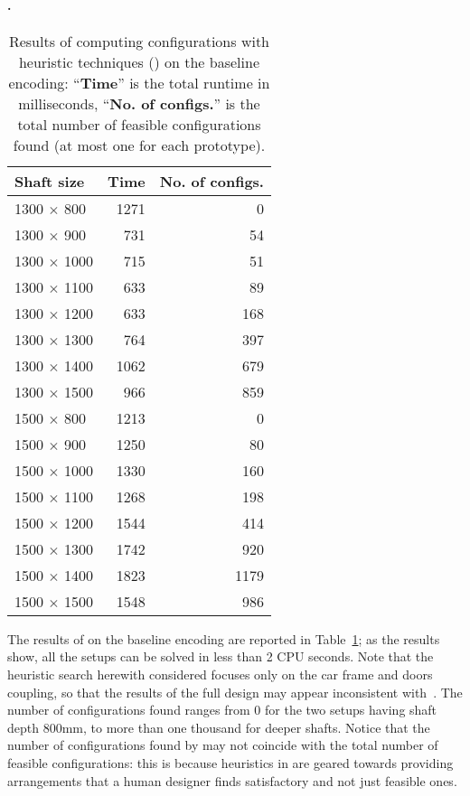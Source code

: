 \paragraph{\liftcreatehr.}
%
\begin{table}[t]
	\caption{\label{table:heuristicResult} Results of computing configurations with 
		heuristic techniques (\liftcreatehr{}) on the baseline encoding: 
		``\textbf{Time}'' is the total runtime in milliseconds, 
		``\textbf{No. of configs.}'' is the total number of feasible configurations 
		found (at most one for each prototype).}
	\setlength{\tabcolsep}{22pt}
	\centering
	\begin{tabular}{l rr}
		\toprule
		{\bf Shaft size} & {\bf Time} & {\bf No. of configs.}\\
		\midrule
		1300 $\times$ 800 & 1271 & 0 \\
		1300 $\times$ 900 & 731 & 54 \\
		1300 $\times$ 1000 & 715 & 51 \\
		1300 $\times$ 1100 & 633 & 89 \\
		1300 $\times$ 1200 & 633 & 168 \\
		1300 $\times$ 1300 & 764 & 397 \\
		1300 $\times$ 1400 & 1062 & 679 \\
		1300 $\times$ 1500 & 966 & 859 \\
		1500 $\times$ 800 & 1213 & 0 \\
		1500 $\times$ 900 & 1250 & 80 \\
		1500 $\times$ 1000 & 1330 & 160 \\
		1500 $\times$ 1100 & 1268 & 198 \\
		1500 $\times$ 1200 & 1544 & 414 \\
		1500 $\times$ 1300 & 1742 & 920 \\
		1500 $\times$ 1400 & 1823 & 1179 \\
		1500 $\times$ 1500 & 1548 & 986 \\
		\bottomrule
	\end{tabular}
\end{table}
%
The results of \liftcreatehr{} on the baseline encoding are reported in
Table~\ref{table:heuristicResult}; as the results show, all the setups 
can be solved in less than 2 CPU seconds. Note that
the heuristic search herewith considered focuses only on the car frame
and doors coupling, so that the results of the full design may appear
inconsistent with~\cite{AiLift2}.
The number of configurations found ranges from $0$ for the
two setups having shaft depth $800$mm, to more than one thousand for deeper 
shafts. Notice that the number of configurations found by \liftcreatehr{} 
may not coincide with the total number of feasible configurations: this is 
because heuristics in \liftcreate{} are geared towards providing arrangements 
that a human designer finds satisfactory and not just feasible ones.
 
